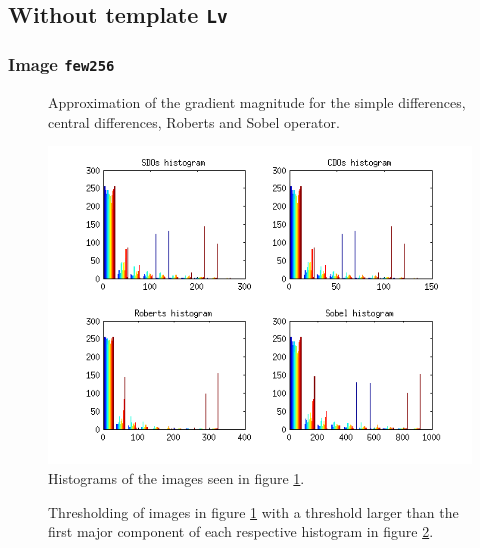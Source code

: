 \subsection{Without template \texttt{Lv}}
\subsubsection{Image \texttt{few256}}

\begin{figure}[H]
	\centering
	\scalebox{0.7}{}
	\caption{Approximation of the gradient magnitude for the simple differences,
  central differences, Roberts and Sobel operator.}
	\label{fig:Q2:2_tools}
\end{figure}

\begin{figure}[H]
	\centering
	\includegraphics[scale=0.8]{./images/Q2/tools/histogram_1.png}
	\caption{Histograms of the images seen in figure \ref{fig:Q2:2_tools}.}
	\label{fig:Q2:histogram_tools}
\end{figure}


\begin{figure}[H]
	\centering
	\scalebox{0.9}{}
	\caption{Thresholding of images in figure \ref{fig:Q2:2_tools} with a
    threshold larger than the first major component of
	  each respective histogram in figure \ref{fig:Q2:histogram_tools}.}
	\label{fig:Q2:threshold_tools_1}
\end{figure}

